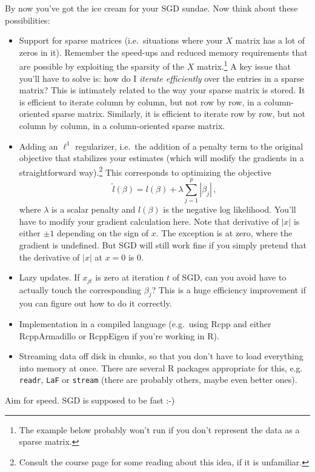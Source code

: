 \documentclass[11 pt]{article}
\begin{document}
By now you've got the ice cream for your SGD sundae.  Now think about these possibilities:
\begin{itemize}
	\item Support for sparse matrices (i.e.~situations where your $X$ matrix has a lot of zeros in it).  Remember the speed-ups and reduced memory requirements that are possible by exploiting the sparsity of the $X$ matrix.\footnote{The example below probably won't run if you don't represent the data as a sparse matrix. }  A key issue that you'll have to solve is: how do I \emph{iterate efficiently} over the entries in a sparse matrix?  This is intimately related to the way your sparse matrix is stored.  It is efficient to iterate column by column, but not row by row, in a column-oriented sparse matrix.  Similarly, it is efficient to iterate row by row, but not column by column, in a column-oriented sparse matrix.
	\item Adding an $\ell^1$ regularizer, i.e.~the addition of a penalty term to the original objective that stabilizes your estimates (which will modify the gradients in a straightforward way).\footnote{Consult the course page for some reading about this idea, if it is unfamiliar.}  This corresponds to optimizing the objective
	$$
	\tilde{l}(\beta) = l(\beta) + \lambda \sum_{j=1}^p |\beta_j| \, ,
	$$
	where $\lambda$ is a scalar penalty and $l(\beta)$ is the negative log likelihood.  You'll have to modify your gradient calculation here.  Note that derivative of $|x|$ is either $\pm 1$ depending on the sign of $x$.  The exception is at zero, where the gradient is undefined.  But SGD will still work fine if you simply pretend that the derivative of $|x|$ at $x=0$ is 0.
	\item Lazy updates.  If $x_{jt}$ is zero at iteration $t$ of SGD, can you avoid have to actually touch the corresponding $\beta_j$?  This is a huge efficiency improvement if you can figure out how to do it correctly.
	\item Implementation in a compiled language (e.g.~using Rcpp and either RcppArmadillo or RcppEigen if you're working in R).
	\item Streaming data off disk in chunks, so that you don't have to load everything into memory at once.  There are several R packages appropriate for this, e.g. \verb|readr|, \verb|LaF| or \verb|stream| (there are probably others, maybe even better ones).
\end{itemize}

Aim for speed.  SGD is supposed to be fast :-)
\end{document}
